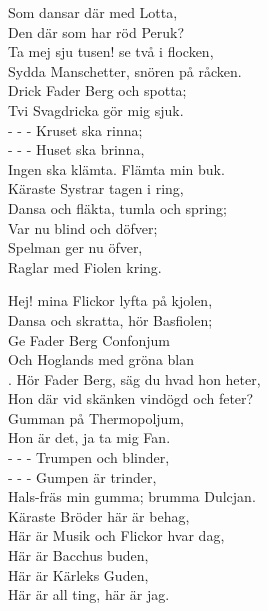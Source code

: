 Som dansar där med Lotta,\\
Den där som har röd Peruk?\\
Ta mej sju tusen! se två i flocken,\\
Sydda Manschetter, snören på råcken.\\
Drick Fader Berg och spotta;\\
Tvi Svagdricka gör mig sjuk.\\
-  -  -  Kruset ska rinna;\\
-  -  -  Huset ska brinna,\\
Ingen ska klämta. Flämta min buk.\\
Käraste Systrar tagen i ring,\\
Dansa och fläkta, tumla och spring;\\
Var nu blind och döfver;\\
Spelman ger nu öfver,\\
Raglar med Fiolen kring.\par
\vspace{10pt}
Hej! mina Flickor lyfta på kjolen,\\
Dansa och skratta, hör Basfiolen;\\
Ge Fader Berg Confonjum\\
Och Hoglands med gröna blan\\.
Hör Fader Berg, säg du hvad hon heter,\\
Hon där vid skänken vindögd och feter?\\
Gumman på Thermopoljum,\\
Hon är det, ja ta mig Fan.\\
-  -  -  Trumpen och blinder,\\
-  -  -  Gumpen är trinder,\\
Hals-fräs min gumma; brumma Dulcjan.\\
Käraste Bröder här är behag,\\
Här är Musik och Flickor hvar dag,\\
Här är Bacchus buden,\\
Här är Kärleks Guden,\\
Här är all ting, här är jag.
